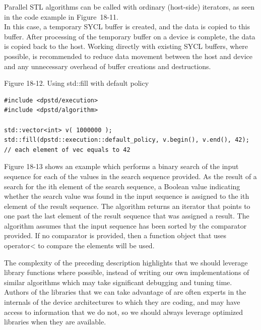\begin{tcolorbox}[colback=blue!5!white,colframe=blue!75!black, title=REDUCE DATA COPYING BETWEEN THE HOST AND DEVICE]
Parallel STL algorithms can be called with ordinary (host-side) iterators, as seen in the code example in Figure 18-11.\\

In this case, a temporary SYCL buffer is created, and the data is copied to this buffer. After processing of the temporary buffer on a device is complete, the data is copied back to the host. Working directly with existing SYCL buffers, where possible, is recommended to reduce data movement between the host and device and any unnecessary overhead of buffer creations and destructions.
\end{tcolorbox}

\hspace*{\fill} \par %
Figure 18-12. Using std::fill with default policy
\begin{lstlisting}[caption={}]
#include <dpstd/execution>
#include <dpstd/algorithm>

std::vector<int> v( 1000000 );
std::fill(dpstd::execution::default_policy, v.begin(), v.end(), 42);
// each element of vec equals to 42
\end{lstlisting}

Figure 18-13 shows an example which performs a binary search of the input sequence for each of the values in the search sequence provided. As the result of a search for the ith element of the search sequence, a Boolean value indicating whether the search value was found in the input sequence is assigned to the ith element of the result sequence. The algorithm returns an iterator that points to one past the last element of the result sequence that was assigned a result. The algorithm assumes that the input sequence has been sorted by the comparator provided. If no comparator is provided, then a function object that uses operator< to compare the elements will be used.\par

The complexity of the preceding description highlights that we should leverage library functions where possible, instead of writing our own implementations of similar algorithms which may take significant debugging and tuning time. Authors of the libraries that we can take advantage of are often experts in the internals of the device architectures to which they are coding, and may have access to information that we do not, so we should always leverage optimized libraries when they are available.\par

